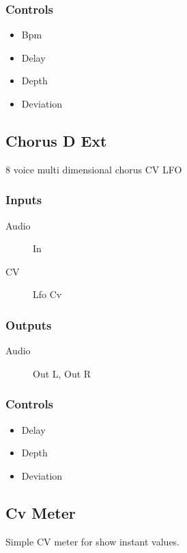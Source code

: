 \subsubsection{Controls}
\begin{itemize}
\item Bpm
\item Delay
\item Depth
\item Deviation
\end{itemize}

\subsection{Chorus D Ext}

8 voice multi dimensional chorus CV LFO



\subsubsection{Inputs}
\begin{description}
\item [Audio] In
\item [CV] Lfo Cv
\end{description}

\subsubsection{Outputs}
\begin{description}
\item [Audio] Out L, Out R
\end{description}

\subsubsection{Controls}
\begin{itemize}
\item Delay
\item Depth
\item Deviation
\end{itemize}

\subsection{Cv Meter}

Simple CV meter for show instant values.



